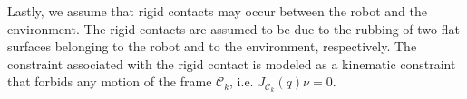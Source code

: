 \documentclass[12pt,a4paper,twoside]{article}
\newtheorem{assumption}{\bf{Assumption}}
\begin{document}
Lastly, we assume that  rigid contacts may occur between the robot and the environment. The rigid contacts are assumed to be due to the rubbing of two flat surfaces belonging to the robot and to the environment, respectively.
The constraint associated with the rigid contact is  modeled as a kinematic constraint that forbids any motion of the frame $\mathcal{C}_k$, i.e. ${J}_{\mathcal{C}_k}(q) {\nu} = 0$.

%        
\end{document}
